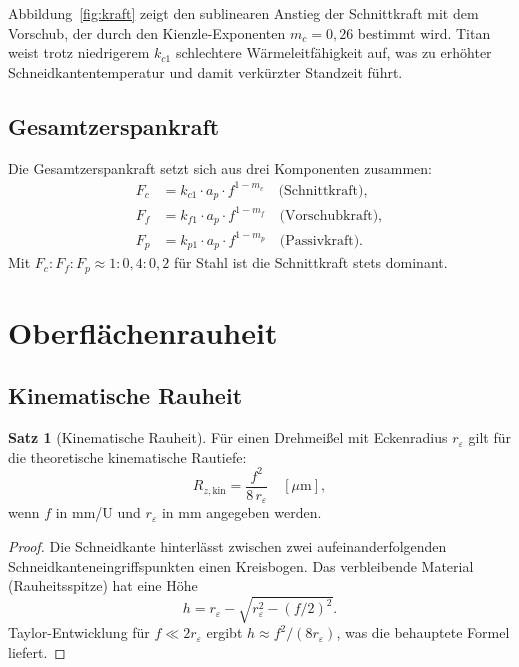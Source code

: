 ﻿\documentclass[a4paper,12pt]{article}
\theoremstyle{definition}
\newtheorem{satz}{Satz}
\begin{document}
Abbildung~\ref{fig:kraft} zeigt den sublinearen Anstieg der Schnittkraft mit
dem Vorschub, der durch den Kienzle-Exponenten $m_c = 0{,}26$ bestimmt wird.
Titan weist trotz niedrigerem $k_{c1}$ schlechtere Wärmeleitfähigkeit auf,
was zu erhöhter Schneidkantentemperatur und damit verkürzter Standzeit führt.

\subsection{Gesamtzerspankraft}

Die Gesamtzerspankraft setzt sich aus drei Komponenten zusammen:
\begin{align}
  F_c &= k_{c1} \cdot a_p \cdot f^{1-m_c} \quad \text{(Schnittkraft)}, \\
  F_f &= k_{f1} \cdot a_p \cdot f^{1-m_f} \quad \text{(Vorschubkraft)}, \\
  F_p &= k_{p1} \cdot a_p \cdot f^{1-m_p} \quad \text{(Passivkraft)}.
\end{align}
Mit $F_c : F_f : F_p \approx 1 : 0{,}4 : 0{,}2$ für Stahl ist die Schnittkraft
stets dominant.

\section{Oberflächenrauheit}
\label{sec:rauheit}

\subsection{Kinematische Rauheit}

\begin{satz}[Kinematische Rauheit]
\label{satz:rauheit}
  Für einen Drehmeißel mit Eckenradius $r_\varepsilon$ gilt für die
  theoretische kinematische Rautiefe:
  \[
    R_{z,\mathrm{kin}} = \frac{f^2}{8 \, r_\varepsilon} \quad [\mu\mathrm{m}],
  \]
  wenn $f$ in mm/U und $r_\varepsilon$ in mm angegeben werden.
\end{satz}

\begin{proof}
  Die Schneidkante hinterlässt zwischen zwei aufeinanderfolgenden Schneidkanteneingriffspunkten
  einen Kreisbogen. Das verbleibende Material (Rauheitsspitze) hat eine Höhe
  \[
    h = r_\varepsilon - \sqrt{r_\varepsilon^2 - (f/2)^2}.
  \]
  Taylor-Entwicklung für $f \ll 2r_\varepsilon$ ergibt
  $h \approx f^2 / (8 r_\varepsilon)$, was die behauptete Formel liefert. \qedhere
\end{proof}
\end{document}
